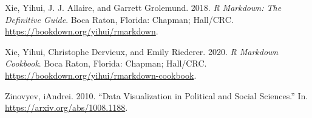 \documentclass[
  letterpaper,
  DIV=11,
  numbers=noendperiod]{scrreprt}
\newlength{\cslhangindent}
\newenvironment{CSLReferences}[2] %
 {\begin{list}{}{%
  \setlength{\itemindent}{0pt}
  \setlength{\leftmargin}{0pt}
  \setlength{\parsep}{0pt}
  \ifodd #1
   \setlength{\leftmargin}{\cslhangindent}
   \setlength{\itemindent}{-1\cslhangindent}
  \fi
  \setlength{\itemsep}{#2\baselineskip}}}
 {\end{list}}
\begin{document}
\begin{CSLReferences}{1}{0}
Xie, Yihui, J. J. Allaire, and Garrett Grolemund. 2018. \emph{R
Markdown: The Definitive Guide}. Boca Raton, Florida: Chapman; Hall/CRC.
\url{https://bookdown.org/yihui/rmarkdown}.

Xie, Yihui, Christophe Dervieux, and Emily Riederer. 2020. \emph{R
Markdown Cookbook}. Boca Raton, Florida: Chapman; Hall/CRC.
\url{https://bookdown.org/yihui/rmarkdown-cookbook}.

Zinovyev, iAndrei. 2010. {``Data Visualization in Political and Social
Sciences.''} In. \url{https://arxiv.org/abs/1008.1188}.

\end{CSLReferences}
\end{document}
